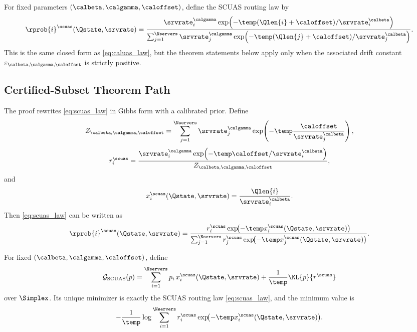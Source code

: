 \begin{definition}
\label{def:scuas_family}
For fixed parameters $(\calbeta, \calgamma, \caloffset)$, define the SCUAS routing law by
\begin{equation}
\label{eq:scuas_law}
\rprob{i}^{\scuas}(\Qstate, \srvrate)
=
\frac{\srvrate_i^{\calgamma} \exp\!\left(-\temp (\Qlen{i}+\caloffset)/\srvrate_i^{\calbeta}\right)}
{\sum_{j=1}^{\Nservers} \srvrate_j^{\calgamma} \exp\!\left(-\temp (\Qlen{j}+\caloffset)/\srvrate_j^{\calbeta}\right)}.
\end{equation}
This is the same closed form as \eqref{eq:caluas_law}, but the theorem statements below apply only when the associated drift constant $\varepsilon_{\calbeta,\calgamma,\caloffset}$ is strictly positive.
\end{definition}

\subsection{Certified-Subset Theorem Path}
\label{sec:scuas_theorem}

The proof rewrites \eqref{eq:scuas_law} in Gibbs form with a calibrated prior.
Define
\begin{equation}
\label{eq:scuas_Z}
Z_{\calbeta,\calgamma,\caloffset}
=
\sum_{j=1}^{\Nservers} \srvrate_j^{\calgamma}
\exp\!\left(-\temp \frac{\caloffset}{\srvrate_j^{\calbeta}}\right),
\end{equation}
\begin{equation}
\label{eq:scuas_prior}
r_i^{\scuas}
=
\frac{\srvrate_i^{\calgamma} \exp\!\left(-\temp \caloffset/\srvrate_i^{\calbeta}\right)}
{Z_{\calbeta,\calgamma,\caloffset}},
\end{equation}
and
\begin{equation}
\label{eq:scuas_energy}
x_i^{\scuas}(\Qstate,\srvrate)
=
\frac{\Qlen{i}}{\srvrate_i^{\calbeta}}.
\end{equation}
Then \eqref{eq:scuas_law} can be written as
\begin{equation}
\label{eq:scuas_gibbs}
\rprob{i}^{\scuas}(\Qstate,\srvrate)
=
\frac{r_i^{\scuas} \exp\!\bigl(-\temp x_i^{\scuas}(\Qstate,\srvrate)\bigr)}
{\sum_{j=1}^{\Nservers} r_j^{\scuas} \exp\!\bigl(-\temp x_j^{\scuas}(\Qstate,\srvrate)\bigr)}.
\end{equation}

\begin{proposition}
\label{prop:scuas_variational}
For fixed $(\calbeta,\calgamma,\caloffset)$, define
\begin{equation}
\label{eq:scuas_variational_obj}
\mathcal{G}_{\mathrm{SCUAS}}(p)
=
\sum_{i=1}^{\Nservers} p_i \, x_i^{\scuas}(\Qstate,\srvrate)
+ \frac{1}{\temp}\KL{p}{r^{\scuas}}
\end{equation}
over $\Simplex$.
Its unique minimizer is exactly the SCUAS routing law \eqref{eq:scuas_law}, and the minimum value is
\begin{equation}
\label{eq:scuas_min_value}
-\frac{1}{\temp}\log \sum_{i=1}^{\Nservers} r_i^{\scuas}
\exp\!\bigl(-\temp x_i^{\scuas}(\Qstate,\srvrate)\bigr).
\end{equation}
\end{proposition}

